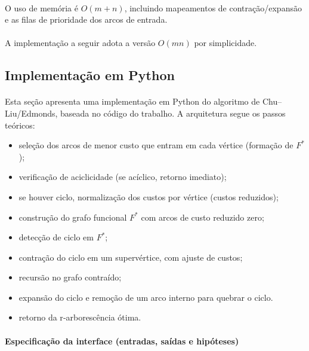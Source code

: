 \documentclass[12pt,a4paper]{article}
\begin{document}
\paragraph{}
O uso de memória é \(O(m+n)\), incluindo mapeamentos de contração/expansão e as filas de prioridade dos arcos de entrada.

\paragraph{}
A implementação a seguir adota a versão \(O(mn)\) por simplicidade.

\subsection{Implementação em Python}

\paragraph{}
Esta seção apresenta uma implementação em Python do algoritmo de Chu–Liu/Edmonds, baseada no código do trabalho. A arquitetura segue os passos teóricos:

\begin{itemize}\setlength{\itemsep}{2pt}
    \item seleção dos arcos de menor custo que entram em cada vértice (formação de \(F^*\));
    \item verificação de aciclicidade (se acíclico, retorno imediato);
    \item se houver ciclo, normalização dos custos por vértice (custos reduzidos);
    \item construção do grafo funcional \(F^*\) com arcos de custo reduzido zero;
    \item detecção de ciclo em \(F^*\);
    \item contração do ciclo em um supervértice, com ajuste de custos;
    \item recursão no grafo contraído;
    \item expansão do ciclo e remoção de um arco interno para quebrar o ciclo.
    \item retorno da r‑arborescência ótima.
\end{itemize}

\paragraph{Especificação da interface (entradas, saídas e hipóteses)}
\end{document}
